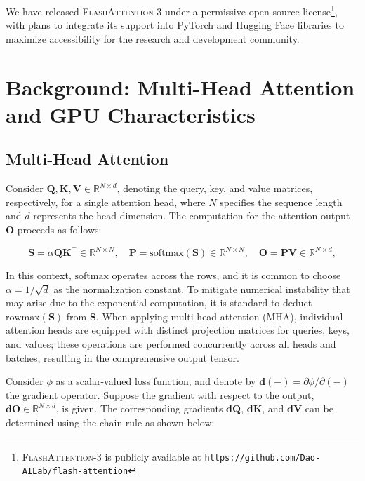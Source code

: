 We have released \textsc{FlashAttention-3} under a permissive open-source license\footnote{\textsc{FlashAttention-3} is publicly available at \texttt{https://github.com/Dao-AILab/flash-attention}}, with plans to integrate its support into PyTorch and Hugging Face libraries to maximize accessibility for the research and development community.

\section{Background: Multi-Head Attention and GPU Characteristics}
\label{sec:background}

\subsection{Multi-Head Attention}
\label{subsec:multi_head_attn}

Consider $\mathbf{Q}, \mathbf{K}, \mathbf{V} \in \mathbb{R}^{N \times d}$, denoting the query, key, and value matrices, respectively, for a single attention head, where $N$ specifies the sequence length and $d$ represents the head dimension. The computation for the attention output $\mathbf{O}$ proceeds as follows:

\begin{equation*}
  \mathbf{S} = \alpha \mathbf{Q} \mathbf{K}^\top \in \mathbb{R}^{N \times N}, \quad \mathbf{P} = \mathrm{softmax}(\mathbf{S}) \in \mathbb{R}^{N \times N}, \quad \mathbf{O} = \mathbf{P}\mathbf{V} \in \mathbb{R}^{N \times d},
\end{equation*}

In this context, $\mathrm{softmax}$ operates across the rows, and it is common to choose $\alpha = 1/\sqrt{d}$ as the normalization constant. To mitigate numerical instability that may arise due to the exponential computation, it is standard to deduct $\mathrm{rowmax}(\mathbf{S})$ from $\mathbf{S}$. When applying multi-head attention (MHA), individual attention heads are equipped with distinct projection matrices for queries, keys, and values; these operations are performed concurrently across all heads and batches, resulting in the comprehensive output tensor.

Consider $\phi$ as a scalar-valued loss function, and denote by $\mathbf{d}(-) = \partial \phi / \partial (-)$ the gradient operator. Suppose the gradient with respect to the output, $\mathbf{dO} \in \mathbb{R}^{N \times d}$, is given. The corresponding gradients $\mathbf{dQ}$, $\mathbf{dK}$, and $\mathbf{dV}$ can be determined using the chain rule as shown below:

